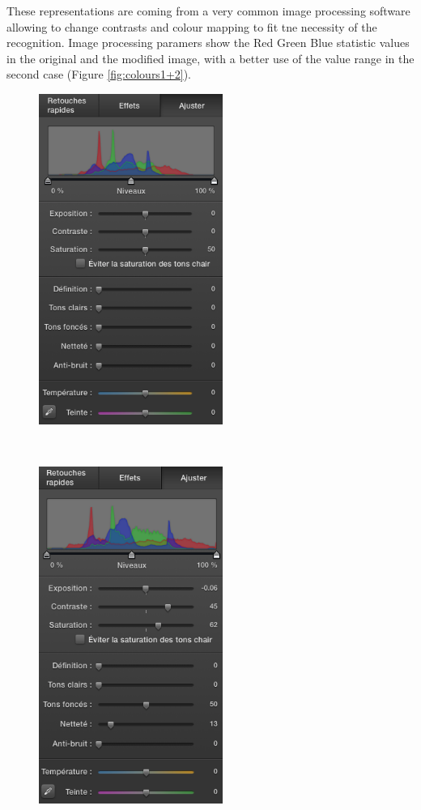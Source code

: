 These representations are coming from a very common image processing software 
allowing to change contrasts and colour mapping to fit tne necessity of the recognition.
Image processing paramers show the Red Green Blue statistic values in the original
and the modified image, with a better use of the value range in the second case
(Figure \ref{fig:colours1+2}).



\begin{figure}[hbtp]
\begin{center}
\leavevmode 
\begin{minipage}{6cm}
\begin{center} 
\includegraphics[width=6cm]{senegalColours.png} 
\end{center}
\end{minipage}~~~~~~~~~\begin{minipage}{6cm}
\begin{center} 
\includegraphics[width=6cm]{senegalColours2.png} 

\end{center}
\end{minipage}
\end{center}
\end{figure}
